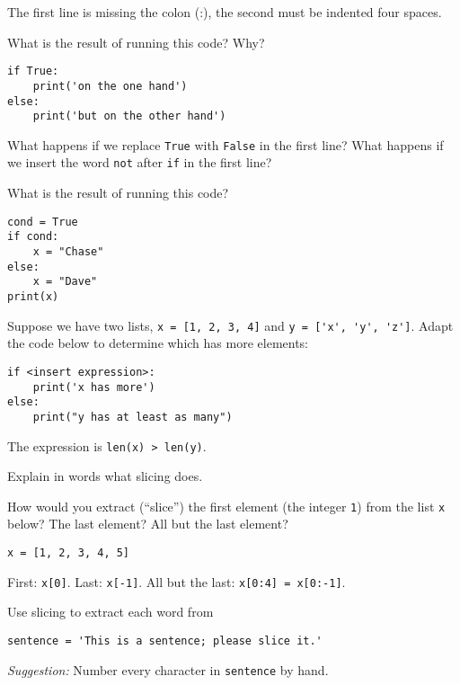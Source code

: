 \documentclass[11pt]{exam}
\begin{document}
\begin{questions}
\begin{solution}
The first line is missing the colon (:), the second must be indented four spaces.
\end{solution}

\item What is the result of running this code?  Why?
\begin{verbatim}
if True:
    print('on the one hand')
else:
    print('but on the other hand')
\end{verbatim}
What happens if we replace {\tt True} with {\tt False} in the first line?
What happens if we insert the word {\tt not} after {\tt if} in the first line?

\item What is the result of running this code?
\begin{verbatim}
cond = True
if cond:
    x = "Chase"
else:
    x = "Dave"
print(x)
\end{verbatim}

\item Suppose we have two lists,
{\tt x = [1, 2, 3, 4]} and \verb|y = ['x', 'y', 'z']|.
Adapt the code below to determine which has more elements:
\begin{verbatim}
if <insert expression>:
    print('x has more')
else:
    print("y has at least as many")
\end{verbatim}

\begin{solution}
The expression is \verb|len(x) > len(y)|.
\end{solution}


\item Explain in words what slicing does.

\item How would you extract (``slice'') the first element (the integer {\tt 1}) from the list {\tt x} below?
The last element?  All but the last element?
\begin{verbatim}
x = [1, 2, 3, 4, 5]
\end{verbatim}

\begin{solution}
First:  {\tt x[0]}.  Last:  {\tt x[-1]}.  All but the last:  {\tt x[0:4] = x[0:-1]}.
\end{solution}


\item Use slicing to extract each word from
\begin{verbatim}
sentence = 'This is a sentence; please slice it.'
\end{verbatim}
{\it Suggestion:\/} Number every character in {\tt sentence} by hand.



\end{questions}
\end{document}
